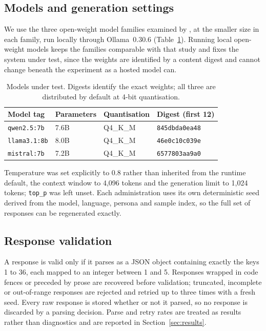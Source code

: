 \subsection{Models and generation settings}
\label{subsec:models}

We use the three open-weight model families examined by
\textcite{munker2025cultural}, at the smaller size in each family, run locally
through Ollama~0.30.6 (Table~\ref{tab:models}). Running local open-weight models
keeps the families comparable with that study and fixes the system under test,
since the weights are identified by a content digest and cannot change beneath
the experiment as a hosted model can.

\begin{table}[H]
\centering
\caption{Models under test. Digests identify the exact weights; all three are
distributed by default at 4-bit quantisation.}
\label{tab:models}
\begin{tabular}{@{}llll@{}}
\toprule
\textbf{Model tag} & \textbf{Parameters} & \textbf{Quantisation} & \textbf{Digest (first 12)} \\
\midrule
\texttt{qwen2.5:7b}  & 7.6B & Q4\_K\_M & \texttt{845dbda0ea48} \\
\texttt{llama3.1:8b} & 8.0B & Q4\_K\_M & \texttt{46e0c10c039e} \\
\texttt{mistral:7b}  & 7.2B & Q4\_K\_M & \texttt{6577803aa9a0} \\
\bottomrule
\end{tabular}
\end{table}

Temperature was set explicitly to 0.8 rather than inherited from the runtime
default, the context window to 4{,}096 tokens and the generation limit to 1{,}024
tokens; \texttt{top\_p} was left unset. Each administration uses its own
deterministic seed derived from the model, language, persona and sample index, so
the full set of responses can be regenerated exactly.

\subsection{Response validation}
\label{subsec:validation}

A response is valid only if it parses as a JSON object containing exactly the
keys 1 to 36, each mapped to an integer between 1 and 5. Responses wrapped in
code fences or preceded by prose are recovered before validation; truncated,
incomplete or out-of-range responses are rejected and retried up to three times
with a fresh seed. Every raw response is stored whether or not it parsed, so no
response is discarded by a parsing decision. Parse and retry rates are treated as
results rather than diagnostics and are reported in Section~\ref{sec:results}.

